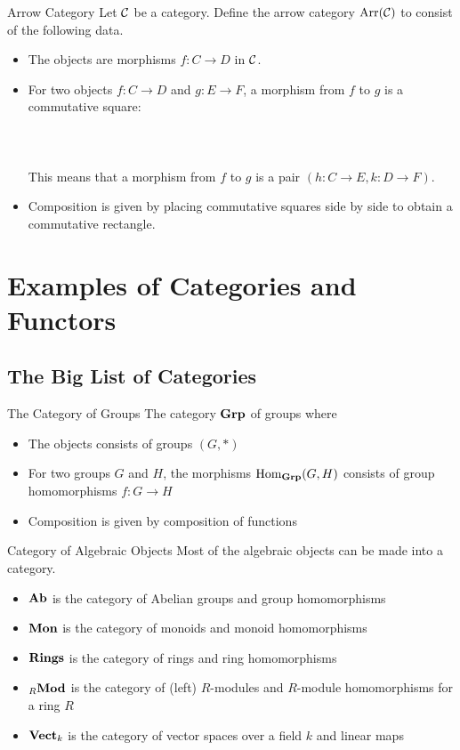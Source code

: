 \documentclass[a4paper]{article}
\begin{document}
\begin{defn}{Arrow Category}{} Let $\mathcal{C}$ be a category. Define the arrow category $\text{Arr}(\mathcal{C})$ to consist of the following data. 
\begin{itemize}
\item The objects are morphisms $f:C\to D$ in $\mathcal{C}$. 
\item For two objects $f:C\to D$ and $g:E\to F$, a morphism from $f$ to $g$ is a commutative square: \\~\\
\\~\\
This means that a morphism from $f$ to $g$ is a pair $(h:C\to E,k:D\to F)$. 
\item Composition is given by placing commutative squares side by side to obtain a commutative rectangle. 
\end{itemize}
\end{defn}

\pagebreak
\section{Examples of Categories and Functors}
\subsection{The Big List of Categories}
\begin{defn}{The Category of Groups}{} The category $\bold{Grp}$ of groups where 
\begin{itemize}
\item The objects consists of groups $(G,\ast)$
\item For two groups $G$ and $H$, the morphisms $\operatorname{Hom}_\bold{Grp}(G,H)$ consists of group homomorphisms $f:G\to H$
\item Composition is given by composition of functions
\end{itemize}
\end{defn}

\begin{defn}{Category of Algebraic Objects}{} Most of the algebraic objects can be made into a category. 
\begin{itemize}
\item $\bold{Ab}$ is the category of Abelian groups and group homomorphisms
\item $\bold{Mon}$ is the category of monoids and monoid homomorphisms
\item $\bold{Rings}$ is the category of rings and ring homomorphisms
\item ${_R}\bold{Mod}$ is the category of (left) $R$-modules and $R$-module homomorphisms for a ring $R$
\item $\bold{Vect}_k$ is the category of vector spaces over a field $k$ and linear maps
\end{itemize}
\end{defn}
\end{document}
